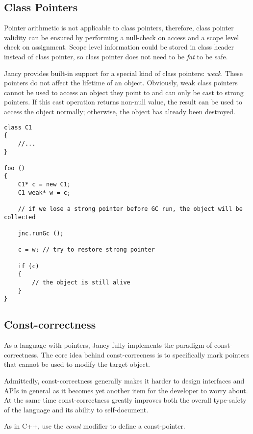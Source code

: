 \documentclass[oneside]{book}
\begin{document}
\subsection{Class Pointers}

Pointer arithmetic is not applicable to class pointers, therefore, class pointer validity can be ensured by performing a null-check on access and a scope level check on assignment. Scope level information could be stored in class header instead of class pointer, so class pointer does not need to be \emph{fat} to be safe.

Jancy provides built-in support for a special kind of class pointers: \emph{weak}. These pointers do not affect the lifetime of an object. Obviously, weak class pointers cannot be used to access an object they point to and can only be cast to strong pointers. If this cast operation returns non-null value, the result can be used to access the object normally; otherwise, the object has already been destroyed.

\begin{lstlisting}
class C1
{
    //...
}

foo ()
{
    C1* c = new C1;
    C1 weak* w = c;

    // if we lose a strong pointer before GC run, the object will be collected

    jnc.runGc ();

    c = w; // try to restore strong pointer

    if (c)
    {
        // the object is still alive
    }
}
\end{lstlisting}

\subsection{Const-correctness}

As a language with pointers, Jancy fully implements the paradigm of const-correctness. The core idea behind const-correcness is to specifically mark pointers that cannot be used to modify the target object.

Admittedly, const-correctness generally makes it harder to design interfaces and APIs in general as it becomes yet another item for the developer to worry about. At the same time const-correctness greatly improves both the overall type-safety of the language and its ability to self-document.

As in C++, use the \emph{const} modifier to define a const-pointer.
\end{document}
